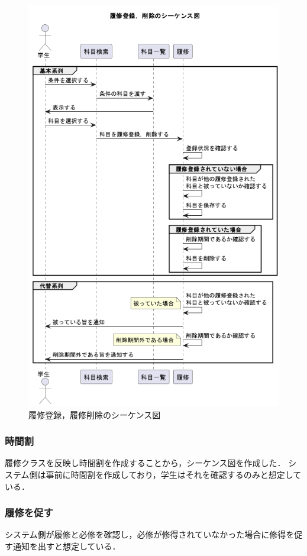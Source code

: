\documentclass[documentclass]{jsarticle}
\begin{document}
\begin{figure}[H]
\begin{minipage}[b]{0.49\columnwidth}
      \includegraphics[width=1.0\columnwidth]{figure/6-2.png}
      \caption{履修登録，履修削除のシーケンス図}
      \label{fig:6-2}
  \end{minipage}
\end{figure}

\subsubsection*{時間割}
履修クラスを反映し時間割を作成することから，シーケンス図を作成した．
システム側は事前に時間割を作成しており，学生はそれを確認するのみと想定している．

\subsubsection*{履修を促す}
システム側が履修と必修を確認し，必修が修得されていなかった場合に修得を促す通知を出すと想定している．
\end{document}
